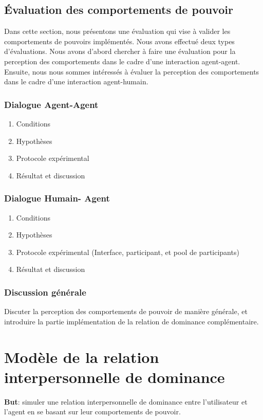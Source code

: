 \documentclass [french]{article}
\begin{document}
			\subsection{Évaluation des comportements de pouvoir}
			Dans cette section, nous présentons une évaluation qui vise à valider les comportements de pouvoirs implémentés. Nous avons effectué deux types d'évaluations. Nous avons d'abord chercher à faire une évaluation pour la perception des comportements dans le cadre d'une interaction agent-agent.  Ensuite, nous nous sommes intéressés à évaluer la perception des comportements dans le cadre d'une interaction agent-humain. 
			
			\subsubsection{Dialogue Agent-Agent}
				\begin{enumerate}
					\item Conditions
					\item Hypothèses
					\item Protocole expérimental
					\item Résultat et discussion 
				\end{enumerate}
			\subsubsection{Dialogue Humain- Agent}
					\begin{enumerate}
						\item Conditions
						\item Hypothèses
						\item Protocole expérimental (Interface, participant, et pool de participants)
						\item Résultat et discussion 
					\end{enumerate}
					
			\subsubsection{Discussion générale}
					Discuter la perception des comportements de pouvoir de manière générale, et introduire la partie implémentation de la relation de dominance complémentaire.
	
	\section{Modèle de la relation interpersonnelle de dominance}
	\textbf{But}: simuler une relation interpersonnelle de dominance entre l'utilisateur et l'agent en se basant sur leur comportements de pouvoir. 
	
\end{document}
